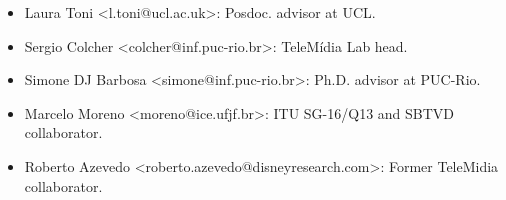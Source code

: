 \begin{itemize}[nosep]
  \item Laura Toni <l.toni@ucl.ac.uk>: Posdoc. advisor at UCL.
  
  \item Sergio Colcher <colcher@inf.puc-rio.br>: TeleMídia Lab head.
  
  \item Simone DJ Barbosa <simone@inf.puc-rio.br>: Ph.D. advisor at PUC-Rio.
  
  \item Marcelo Moreno <moreno@ice.ufjf.br>: ITU SG-16/Q13 and SBTVD collaborator. 
  
  \item Roberto Azevedo <roberto.azevedo@disneyresearch.com>: Former TeleMidia collaborator. 
  
  
  
\end{itemize}